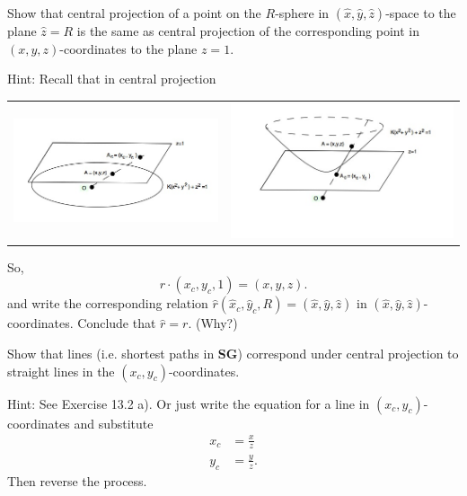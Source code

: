 \documentclass{ximera}
\begin{document}
\begin{exercise}
Show that central projection of a point on the $R$-sphere in $\left(  \hat
{x},\hat{y},\hat{z}\right)  $-space to the plane $\hat{z}=R$ is the same as
central projection of the corresponding point in $\left(  x,y,z\right)
$-coordinates to the plane $z=1$.

Hint: Recall that in central projection

\begin{tabular}
[c]{cc}%
\includegraphics{MXAJBZ0K.jpg}%
 &
\includegraphics{MXAJBZ0L.jpg}%
\end{tabular}
So,%
\begin{equation}
r\cdot\left( x_{c},y_{c},1\right) =\left( x,y,z\right).
\end{equation}
and write the corresponding relation $\hat{r}\left(
\hat{x}_{c},\hat{y}_{c},R\right) =\left( \hat{x},\hat
    {y},\hat{z}\right) $ in $\left( \hat{x},\hat{y},\hat{z}\right)
    $-coordinates. Conclude that $\hat{r}=r$. (Why?)
\end{exercise}

\begin{exercise}
Show that lines (i.e. shortest paths in \textbf{SG}) correspond
under central projection to straight lines in the $\left(  x_{c},y_{c}\right)
$-coordinates.

Hint: See Exercise 13.2 %
a). Or just write the equation for a line in
$\left(  x_{c},y_{c}\right)  $-coordinates and substitute 
\begin{align*}
x_{c}  &=\frac{x}{z}\\
y_{c}  &=\frac{y}{z}.
\end{align*}
Then reverse the process.
\end{exercise}
\end{document}
